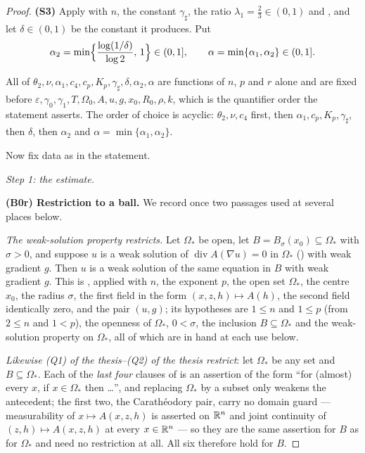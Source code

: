 \begin{proof}
\textbf{(S3)} Apply  with $n$, the constant
$\gamma_\sharp$, the ratio $\lambda_1=\tfrac23\in(0,1)$ and
, and let $\delta\in(0,1)$ be the constant it
produces.  Put
\[
\alpha_2=\min\Bigl\{\frac{\log(1/\delta)}{\log2},\,1\Bigr\}\in(0,1],
\qquad
\alpha=\min\{\alpha_1,\alpha_2\}\in(0,1] .
\]

All of $\theta_2,\nu,\alpha_1,c_4,c_p,K_p,\gamma_\sharp,\delta,\alpha_2,\alpha$
are functions of $n$, $p$ and $r$ alone and are fixed before
$\varepsilon,\gamma_0,\gamma_1,T,\Omega_0,A,u,g,x_0,R_0,\rho,k$, which is the
quantifier order the statement asserts.  The order of choice is acyclic:
$\theta_2,\nu,c_4$ first, then $\alpha_1,c_p,K_p,\gamma_\sharp$, then $\delta$,
then $\alpha_2$ and $\alpha=\min\{\alpha_1,\alpha_2\}$.

Now fix data as in the statement.

\medskip
\noindent\emph{Step 1: the estimate.}

\textbf{(B0r) Restriction to a ball.}  We record once two passages used at
several places below.

\emph{The weak-solution property restricts.}  Let $\Omega_\ast$ be open, let
$B=B_\sigma(x_0)\subseteq\Omega_\ast$ with $\sigma>0$, and suppose $u$ is a weak
solution of $\operatorname{div}A(\nabla u)=0$ in $\Omega_\ast$
() with weak gradient $g$.  Then $u$ is a weak
solution of the same equation in $B$ with weak gradient $g$.  This is
, applied with $n$, the exponent $p$, the open
set $\Omega_\ast$, the centre $x_0$, the radius $\sigma$, the first field in the
form $(x,z,h)\mapsto A(h)$, the second field identically zero, and the pair
$(u,g)$; its hypotheses are $1\le n$ and $1\le p$ (from $2\le n$ and $1<p$), the
openness of $\Omega_\ast$, $0<\sigma$, the inclusion $B\subseteq\Omega_\ast$ and
the weak-solution property on $\Omega_\ast$, all of which are in hand at each
use below.

\emph{Likewise (Q1) of the thesis--(Q2) of the thesis restrict}: let $\Omega_\ast$ be any
set and $B\subseteq\Omega_\ast$.  Each of the \emph{last four} clauses of
 is an
assertion of the form ``for (almost) every $x$, if $x\in\Omega_\ast$ then
\dots'', and replacing $\Omega_\ast$ by a subset only weakens the antecedent;
the first two, the Carath\'eodory pair, carry no domain guard --- measurability
of $x\mapsto A(x,z,h)$ is asserted on $\mathbb{R}^n$ and joint continuity of
$(z,h)\mapsto A(x,z,h)$ at every $x\in\mathbb{R}^n$ --- so they are the same assertion
for $B$ as for $\Omega_\ast$ and need no restriction at all.  All six therefore
hold for $B$.


\end{proof}

